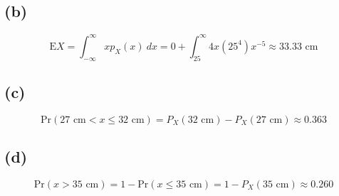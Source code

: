 \documentclass[fleqn, letterpaper]{tufte-handout}
\newcommand{\E}{\text{E}}
\begin{document}
\subsection{(b)}
\[
	\E X = \int_{-\infty}^\infty xp_X(x)\ dx = 0 + \int_{25}^\infty 4x(25^4) x^{-5} \approx 33.33 \text{ cm}
\]
\subsection{(c)}
\[
	\text{Pr}(27 \text{ cm}< x \leq 32\text{ cm}) = P_X(32\text{ cm}) - P_X(27\text{ cm}) \approx 0.363 
\]
\subsection{(d)}
\[
	\text{Pr}(x > 35\text{ cm}) = 1-\text{Pr}(x \leq 35\text{ cm}) = 1-P_X(35\text{ cm})\approx 0.260 
\]
\end{document}
